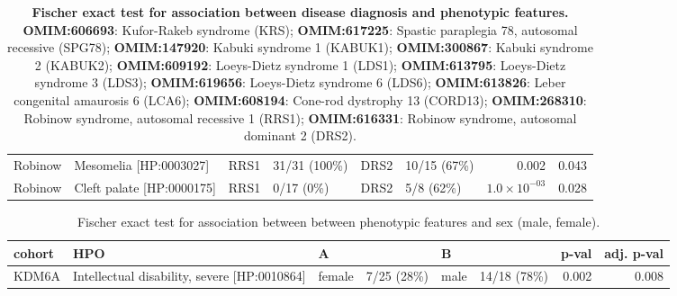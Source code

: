 \begin{table}
\begin{scriptsize}
\begin{tabular}{l>{\raggedright}p{2.5cm}llllrr}
Robinow & Mesomelia [HP:0003027] & RRS1 & 31/31 (100\%) & DRS2 & 10/15 (67\%) & 0.002 & 0.043\\
Robinow & Cleft palate [HP:0000175] & RRS1 & 0/17 (0\%) & DRS2 & 5/8 (62\%) & $1.0 \times 10^{-03}$ & 0.028\\
\bottomrule
\end{tabular}
\end{scriptsize}
\caption{\textbf{Fischer exact test for association between disease diagnosis and phenotypic features.}
\textbf{OMIM:606693}: Kufor-Rakeb syndrome (KRS);
 \textbf{OMIM:617225}: Spastic paraplegia 78, autosomal recessive (SPG78);
 \textbf{OMIM:147920}: Kabuki syndrome 1 (KABUK1);
 \textbf{OMIM:300867}: Kabuki syndrome 2 (KABUK2);
 \textbf{OMIM:609192}: Loeys-Dietz syndrome 1 (LDS1);
 \textbf{OMIM:613795}:  Loeys-Dietz syndrome 3 (LDS3);
 \textbf{OMIM:619656}: Loeys-Dietz syndrome 6 (LDS6);
 \textbf{OMIM:613826}: Leber congenital amaurosis 6 (LCA6);
 \textbf{OMIM:608194}:  Cone-rod dystrophy 13 (CORD13);
 \textbf{OMIM:268310}: Robinow syndrome, autosomal recessive 1 (RRS1);
 \textbf{OMIM:616331}: Robinow syndrome, autosomal dominant 2 (DRS2).
}
\label{tab:to_do}
\end{table}



\clearpage
\newpage

\begin{table}
\centering
\begin{tabular}{l>{\raggedright}p{4cm}lp{1.5cm}lp{1.5cm}rr}
\toprule
\textbf{cohort} & \textbf{HPO} & \textbf{A} & \textbf{} & \textbf{B} & \textbf{} & \textbf{p-val} & \textbf{adj. p-val}\\
\midrule
KDM6A & Intellectual disability, severe [HP:0010864] & female & 7/25 (28\%) & male & 14/18 (78\%) & 0.002 & 0.008\\
\bottomrule
\end{tabular}
\caption{Fischer exact test for association between  between phenotypic features and sex (male, female).}
\label{tab:mf_hpo}
\end{table}

\clearpage
\newpage


